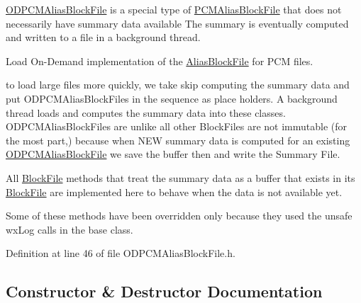 \hyperlink{class_o_d_p_c_m_alias_block_file}{O\+D\+P\+C\+M\+Alias\+Block\+File} is a special type of \hyperlink{class_p_c_m_alias_block_file}{P\+C\+M\+Alias\+Block\+File} that does not necessarily have summary data available The summary is eventually computed and written to a file in a background thread.

Load On-\/\+Demand implementation of the \hyperlink{class_alias_block_file}{Alias\+Block\+File} for P\+CM files.

to load large files more quickly, we take skip computing the summary data and put O\+D\+P\+C\+M\+Alias\+Block\+Files in the sequence as place holders. A background thread loads and computes the summary data into these classes. O\+D\+P\+C\+M\+Alias\+Block\+Files are unlike all other Block\+Files are not immutable (for the most part,) because when N\+EW summary data is computed for an existing \hyperlink{class_o_d_p_c_m_alias_block_file}{O\+D\+P\+C\+M\+Alias\+Block\+File} we save the buffer then and write the Summary File.

All \hyperlink{class_block_file}{Block\+File} methods that treat the summary data as a buffer that exists in its \hyperlink{class_block_file}{Block\+File} are implemented here to behave when the data is not available yet.

Some of these methods have been overridden only because they used the unsafe wx\+Log calls in the base class. 

Definition at line 46 of file O\+D\+P\+C\+M\+Alias\+Block\+File.\+h.



\subsection{Constructor \& Destructor Documentation}
